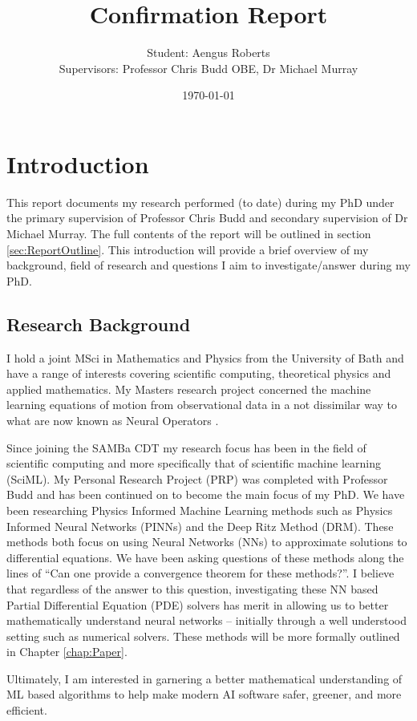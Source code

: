 \documentclass[11pt, onecolumn]{report}
\title{\textbf{Confirmation Report}}
\author{Student: Aengus Roberts\\[0.5em]
    Supervisors: Professor Chris Budd OBE, Dr Michael Murray}
\affil{University of Bath}
\date{}
\begin{document}
\date{\today}
\maketitle

\setcounter{chapter}{-1}

\chapter{Introduction}
This report documents my research performed (to date) during my PhD under the primary supervision of Professor Chris Budd and secondary supervision of Dr Michael Murray. The full contents of the report will be outlined in section \ref{sec:ReportOutline}. This introduction will provide a brief overview of my background, field of research and questions I aim to investigate/answer during my PhD.

\section{Research Background}
I hold a joint MSci in Mathematics and Physics from the University of Bath and have a range of interests covering scientific computing, theoretical physics and applied mathematics. My Masters research project concerned the machine learning equations of motion from observational data in a not dissimilar way to what are now known as Neural Operators \cite{Kovachki_FNO}.

Since joining the SAMBa CDT \cite{SAMBa} my research focus has been in the field of scientific computing and more specifically that of scientific machine learning (SciML). My Personal Research Project (PRP) was completed with Professor Budd and has been continued on to become the main focus of my PhD. We have been researching Physics Informed Machine Learning methods such as Physics Informed Neural Networks (PINNs) and the Deep Ritz Method (DRM). These methods both focus on using Neural Networks (NNs) to approximate solutions to differential equations. We have been asking questions of these methods along the lines of ``Can one provide a convergence theorem for these methods?''. I believe that regardless of the answer to this question, investigating these NN based Partial Differential Equation (PDE) solvers has merit in allowing us to better mathematically understand neural networks -- initially through a well understood setting such as numerical solvers. These methods will be more formally outlined in Chapter \ref{chap:Paper}. 

Ultimately, I am interested in garnering a better mathematical understanding of ML based algorithms to help make modern AI software safer, greener, and more efficient.
\end{document}
